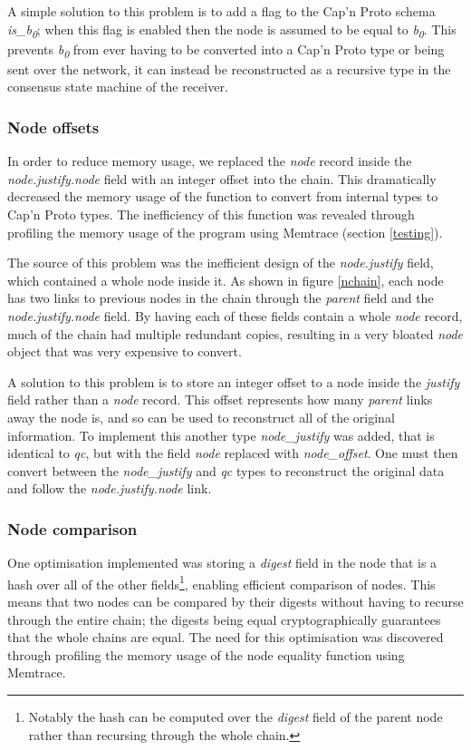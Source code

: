 A simple solution to this problem is to add a flag to the Cap'n Proto schema \textit{is\_b\textsubscript{0}}; when this flag is enabled then the node is assumed to be equal to \textit{b\textsubscript{0}}. This prevents \textit{b\textsubscript{0}} from ever having to be converted into a Cap'n Proto type or being sent over the network, it can instead be reconstructed as a recursive type in the consensus state machine of the receiver.

\subsubsection{Node offsets}
In order to reduce memory usage, we replaced the \textit{node} record inside the \textit{node.justify.node} field with an integer offset into the chain. This dramatically decreased the memory usage of the function to convert from internal types to Cap'n Proto types. The inefficiency of this function was revealed through profiling the memory usage of the program using Memtrace  (section \ref{testing}).

The source of this problem was the inefficient design of the \textit{node.justify} field, which contained a whole node inside it. As shown in figure \ref{nchain}, each node has two links to previous nodes in the chain through the \textit{parent} field and the \textit{node.justify.node} field. By having each of these fields contain a whole \textit{node} record, much of the chain had multiple redundant copies, resulting in a very bloated \textit{node} object that was very expensive to convert.

A solution to this problem is to store an integer offset to a node inside the \textit{justify} field rather than a \textit{node} record. This offset represents how many \textit{parent} links away the node is, and so can be used to reconstruct all of the original information. To implement this another type \textit{node\_justify} was added, that is identical to \textit{qc}, but with the field \textit{node} replaced with \textit{node\_offset}. One must then convert between the \textit{node\_justify} and \textit{qc} types to reconstruct the original data and follow the \textit{node.justify.node} link.

\subsubsection{Node comparison}
One optimisation implemented was storing a \textit{digest} field in the node that is a hash over all of the other fields\footnote{Notably the hash can be computed over the \textit{digest} field of the parent node rather than recursing through the whole chain. }, enabling efficient comparison of nodes. This means that two nodes can be compared by their digests without having to recurse through the entire chain; the digests being equal cryptographically guarantees that the whole chains are equal. The need for this optimisation was discovered through profiling the memory usage of the node equality function using Memtrace.

